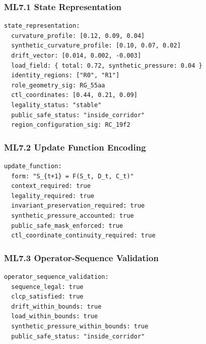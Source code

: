 
\subsubsection*{ML7.1 State Representation}

\begin{verbatim}
state_representation:
  curvature_profile: [0.12, 0.09, 0.04]
  synthetic_curvature_profile: [0.10, 0.07, 0.02]
  drift_vector: [0.014, 0.002, -0.003]
  load_field: { total: 0.72, synthetic_pressure: 0.04 }
  identity_regions: ["R0", "R1"]
  role_geometry_sig: RG_55aa
  ctl_coordinates: [0.44, 0.21, 0.09]
  legality_status: "stable"
  public_safe_status: "inside_corridor"
  region_configuration_sig: RC_19f2
\end{verbatim}


\subsubsection*{ML7.2 Update Function Encoding}

\begin{verbatim}
update_function:
  form: "S_{t+1} = F(S_t, D_t, C_t)"
  context_required: true
  legality_required: true
  invariant_preservation_required: true
  synthetic_pressure_accounted: true
  public_safe_mask_enforced: true
  ctl_coordinate_continuity_required: true
\end{verbatim}



\subsubsection*{ML7.3 Operator-Sequence Validation}

\begin{verbatim}
operator_sequence_validation:
  sequence_legal: true
  clcp_satisfied: true
  drift_within_bounds: true
  load_within_bounds: true
  synthetic_pressure_within_bounds: true
  public_safe_status: "inside_corridor"
\end{verbatim}

